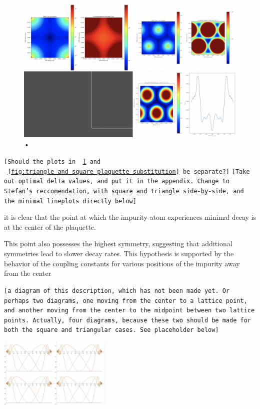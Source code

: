 \documentclass[aps,pra,superscriptaddress,twocolumn]{revtex4-1}
\newcommand{\fref}[1]{\text{Fig.}~\ref{#1}}
\newcommand{\commentSB}[1]{\texttt{\color{blue}[#1]}}
\newcommand{\commentTP}[1]{\texttt{\color{green}[#1]}}
\begin{document}
\begin{figure}
    \centering
    \includegraphics[width=1.0\textwidth]{figures/triangle_and_square_plaquette_interstitial.png} 
    \caption{•}
    \label{fig:triangle_and_square_plaquette_interstitial}
\end{figure}
\commentSB{Should the plots in \fref{fig:triangle_and_square_plaquette_interstitial} and \fref{fig:triangle_and_square_plaquette_substitution} be separate?}
\commentTP{Take out optimal delta values, and put it in the appendix. Change to Stefan's reccomendation, with square and triangle side-by-side, and the minimal lineplots directly below}

it is clear that the point at which the impurity atom experiences minimal decay is at the center of the plaquette. 


This point also possesses the highest symmetry, suggesting that additional symmetries lead to slower decay rates. This hypothesis is supported by the behavior of the coupling constants for various positions of the impurity away from the center 

\commentSB{a diagram of this description, which has not been made yet. Or perhaps two diagrams, one moving from the center to a lattice point, and another moving from the center to the midpoint between two lattice points. Actually, four diagrams, because these two should be made for both the square and triangular cases. See placeholder below}

    \includegraphics[width=0.4\textwidth]{figures/triangle_and_square_interstitial_coupling.png}
\end{document}
